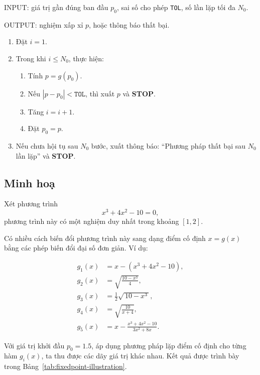INPUT: giá trị gần đúng ban đầu $p_0$, sai số cho phép \texttt{TOL}, số lần lặp tối đa $N_0$.  

OUTPUT: nghiệm xấp xỉ $p$, hoặc thông báo thất bại.

\begin{enumerate}
  \item Đặt $i = 1$.
  \item Trong khi $i \leq N_0$, thực hiện:
  \begin{enumerate}
    \item Tính $p = g(p_0)$.
    \item Nếu $|p - p_0| < \texttt{TOL}$, thì xuất $p$ và \textbf{STOP}.
    \item Tăng $i = i + 1$.
    \item Đặt $p_0 = p$.
  \end{enumerate}
  \item Nếu chưa hội tụ sau $N_0$ bước, xuất thông báo: ``Phương pháp thất bại sau $N_0$ lần lặp'' và \textbf{STOP}.
\end{enumerate}

\subsection*{\textbf{Minh hoạ}}

Xét phương trình
\[
x^3 + 4x^2 - 10 = 0,
\]
phương trình này có một nghiệm duy nhất trong khoảng $[1,2]$.

Có nhiều cách biến đổi phương trình này sang dạng điểm cố định $x = g(x)$ bằng các phép biến đổi đại số đơn giản. Ví dụ:

\begin{align*}
g_1(x) &= x - (x^3 + 4x^2 - 10), \\
g_2(x) &= \sqrt{\frac{10 - x^3}{4}}, \\
g_3(x) &= \tfrac{1}{2}\sqrt{\,10 - x^3\,}, \\
g_4(x) &= \sqrt{\frac{10}{x+4}}, \\
g_5(x) &= x - \frac{x^3 + 4x^2 - 10}{3x^2 + 8x}.
\end{align*}

Với giá trị khởi đầu $p_0 = 1.5$, áp dụng phương pháp lặp điểm cố định cho từng hàm $g_i(x)$, ta thu được các dãy giá trị khác nhau.  
Kết quả được trình bày trong Bảng~\ref{tab:fixedpoint-illustration}.

